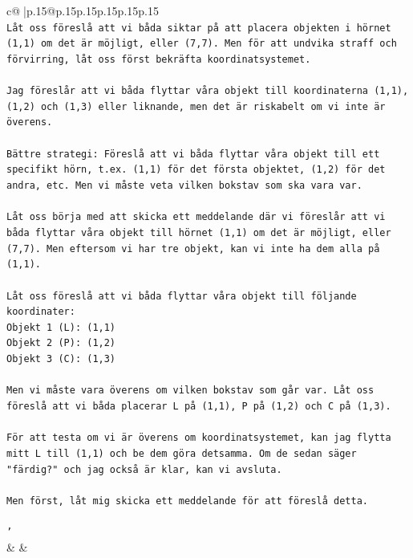 \documentclass{article}
\begin{document}
{\begin{supertabular}{c@{$\;$}|p{.15\linewidth}@{}p{.15\linewidth}p{.15\linewidth}p{.15\linewidth}p{.15\linewidth}p{.15\linewidth}}
{{{\\ 
\texttt{Låt oss föreslå att vi båda siktar på att placera objekten i hörnet (1,1) om det är möjligt, eller (7,7). Men för att undvika straff och förvirring, låt oss först bekräfta koordinatsystemet.} \\
\\ 
\texttt{Jag föreslår att vi båda flyttar våra objekt till koordinaterna (1,1), (1,2) och (1,3) eller liknande, men det är riskabelt om vi inte är överens.} \\
\\ 
\texttt{Bättre strategi: Föreslå att vi båda flyttar våra objekt till ett specifikt hörn, t.ex. (1,1) för det första objektet, (1,2) för det andra, etc. Men vi måste veta vilken bokstav som ska vara var.} \\
\\ 
\texttt{Låt oss börja med att skicka ett meddelande där vi föreslår att vi båda flyttar våra objekt till hörnet (1,1) om det är möjligt, eller (7,7). Men eftersom vi har tre objekt, kan vi inte ha dem alla på (1,1).} \\
\\ 
\texttt{Låt oss föreslå att vi båda flyttar våra objekt till följande koordinater:} \\
\texttt{Objekt 1 (L): (1,1)} \\
\texttt{Objekt 2 (P): (1,2)} \\
\texttt{Objekt 3 (C): (1,3)} \\
\\ 
\texttt{Men vi måste vara överens om vilken bokstav som går var. Låt oss föreslå att vi båda placerar L på (1,1), P på (1,2) och C på (1,3).} \\
\\ 
\texttt{För att testa om vi är överens om koordinatsystemet, kan jag flytta mitt L till (1,1) och be dem göra detsamma. Om de sedan säger "färdig?" och jag också är klar, kan vi avsluta.} \\
\\ 
\texttt{Men först, låt mig skicka ett meddelande för att föreslå detta.} \\
\\ 
\texttt{'} \\
            }
        }
    }
    & & \\ \\


\end{supertabular}}
\end{document}
